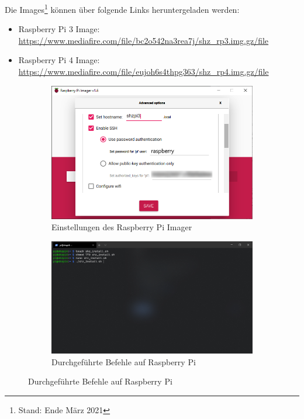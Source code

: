 \noindent Die Images\footnote{Stand: Ende März 2021} können über folgende Links heruntergeladen werden:
\begin{itemize}
    \item Raspberry Pi 3 Image: \url{https://www.mediafire.com/file/bc2o542na3rea7j/shz_rp3.img.gz/file}
    \item Raspberry Pi 4 Image: \url{https://www.mediafire.com/file/eujoh6s4thpg363/shz_rp4.img.gz/file}
\end{itemize}
\begin{figure}[H]
    \begin{subfigure}[b]{0.5\linewidth}
        \includegraphics[width=1\textwidth]{img/pi_img_3_settings.png}
        \caption[Einstellungen des Raspberry Pi Imager]{Einstellungen des Raspberry Pi Imager}
        \label{fig:create_image_01}
    \end{subfigure}
    \begin{subfigure}[b]{0.5\linewidth}
        \includegraphics[width=1\textwidth]{img/pi_img_ssh.png}
        \caption[Durchgeführte Befehle auf Raspberry Pi]{Durchgeführte Befehle auf Raspberry Pi}

\end{subfigure}
\end{figure}

